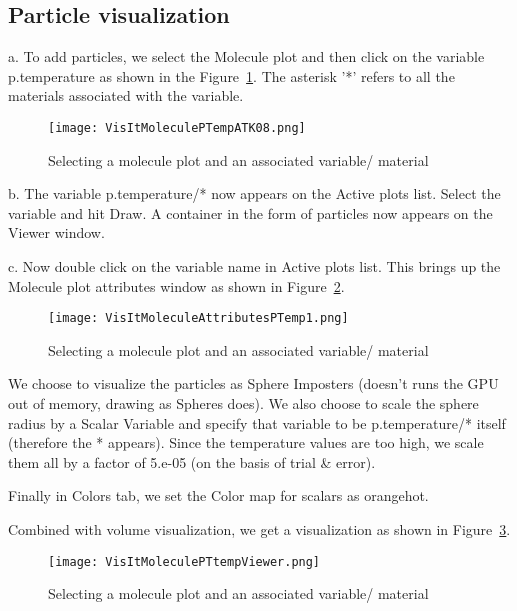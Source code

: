 \subsection{Particle visualization}

a. To add particles, we select the Molecule plot and then click on the variable p.temperature as shown in the Figure~\ref{VisItMoleculePTempATK08}. The asterisk '*' refers to all the materials associated with the variable.

\begin{figure}
  \center
  \texttt{[image: VisItMoleculePTempATK08.png]}
  \caption{Selecting a molecule plot and an associated variable/ material}
  \label{VisItMoleculePTempATK08}
\end{figure}

b. The variable p.temperature/* now appears on the Active plots list. Select the variable and hit Draw. A container in the form of particles now appears on the Viewer window.

c. Now double click on the variable name in Active plots list. This brings up the Molecule plot attributes window as shown in Figure~\ref{VisItMoleculeAttributesPTemp1}.

\begin{figure}
  \center
  \texttt{[image: VisItMoleculeAttributesPTemp1.png]}
  \caption{Selecting a molecule plot and an associated variable/ material}
  \label{VisItMoleculeAttributesPTemp1}
\end{figure}

We choose to visualize the particles as Sphere Imposters (doesn't runs the GPU out of memory, drawing as Spheres does). We also choose to scale the sphere radius by a Scalar Variable and specify that variable to be p.temperature/* itself (therefore the * appears). Since the temperature values are too high, we scale them all by a factor of 5.e-05 (on the basis of trial \& error).

Finally in Colors tab, we set the Color map for scalars as orangehot.

Combined with volume visualization, we get a visualization as shown in Figure~\ref{VisItMoleculePTtempViewer}.

\begin{figure}
  \center
  \texttt{[image: VisItMoleculePTtempViewer.png]}
  \caption{Selecting a molecule plot and an associated variable/ material}
  \label{VisItMoleculePTtempViewer}
\end{figure}

